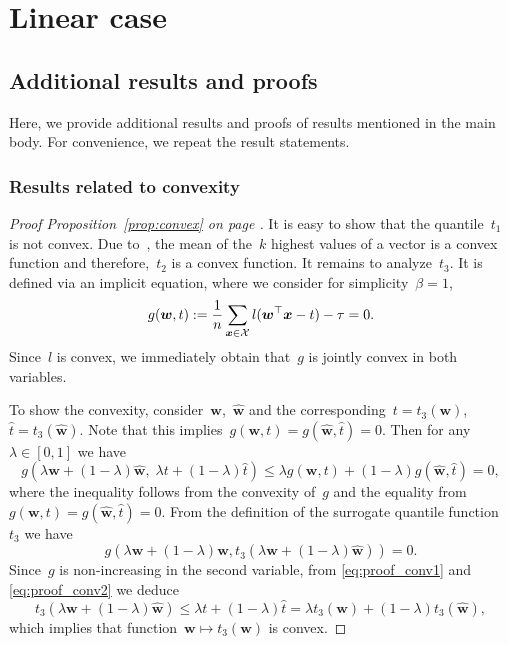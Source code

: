 \chapter{Linear case}

\section{Additional results and proofs}\label{app: proofs primal}

Here, we provide additional results and proofs of results mentioned in the main body. For convenience, we repeat the result statements.

\subsection{Results related to convexity}

\propconvex*
\begin{proof}[Proof Proposition~\ref{prop:convex} on page \pageref{prop:convex}]
  It is easy to show that the quantile~$t_1$ is not convex. Due to~\cite{lapin2015top}, the mean of the~$k$ highest values of a vector is a convex function and therefore,~$t_2$ is a convex function. It remains to analyze~$t_3$. It is defined via an implicit equation, where we consider for simplicity~$\beta=1$,
  \begin{equation*}
    g(\bm{w},t) := \frac{1}{n}\sum_{\bm{x} \in \mathcal{X}} l(\bm{w}^\top \bm{x}-t) - \tau = 0.
  \end{equation*}
  Since~$l$ is convex, we immediately obtain that~$g$ is jointly convex in both variables.

  To show the convexity, consider~$\bm{w}$,~$\hat{\bm{w}}$ and the corresponding~$t= t_3(\bm{w})$,~$\hat{t}=t_3(\hat{\bm{w}})$. Note that this implies~$g(\bm{w}, t)=g(\hat{\bm{w}},\hat{t})=0$. Then for any~$\lambda\in[0,1]$ we have 
  \begin{equation}\label{eq:proof_conv1}
    g(\lambda \bm{w} + (1 - \lambda)\hat{\bm{w}},\;\lambda t + (1 - \lambda)\hat{t})
    \le \lambda g(\bm{w}, t) + (1 - \lambda) g(\hat{\bm{w}}, \hat{t}) = 0,
  \end{equation}
  where the inequality follows from the convexity of~$g$ and the equality from~$g(\bm{w}, t) = g(\hat{\bm{w}}, \hat{t})=0.$
  From the definition of the surrogate quantile function~$t_3$ we have
  \begin{equation}\label{eq:proof_conv2}
    g(\lambda\bm{w} + (1-\lambda)\hat{\bm{w}}, t_3(\lambda\bm{w} + (1-\lambda)\hat{\bm{w}})) = 0.
  \end{equation}
  Since~$g$ is non-increasing in the second variable, from \eqref{eq:proof_conv1} and \eqref{eq:proof_conv2} we deduce
  \begin{equation*}
    t_3(\lambda\bm{w} + (1-\lambda)\hat{\bm{w}})
    \le \lambda t + (1-\lambda)\hat{t}
    =   \lambda t_3(\bm{w})+(1-\lambda) t_3(\hat{\bm{w}}),
  \end{equation*}
  which implies that function~$\bm{w}\mapsto t_3(\bm{w})$ is convex.
\end{proof}

